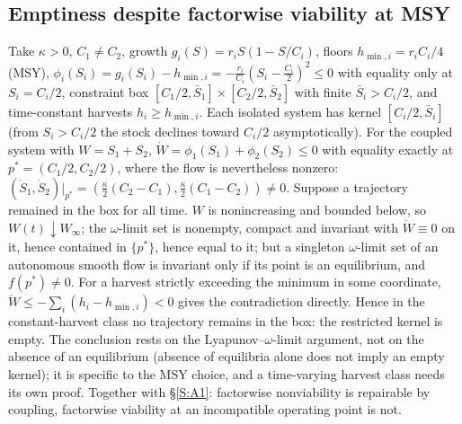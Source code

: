\subsection{Emptiness despite factorwise viability at MSY}\label{S:A2}
Take $\kappa>0$, $C_1\ne C_2$, growth $g_i(S)=r_iS(1-S/C_i)$, floors $h_{\min,i}=r_iC_i/4$ (MSY), $\phi_i(S_i)=g_i(S_i)-h_{\min,i}=-\tfrac{r_i}{C_i}(S_i-\tfrac{C_i}2)^2\le0$ with equality only at $S_i=C_i/2$, constraint box $[C_1/2,\bar S_1]\times[C_2/2,\bar S_2]$ with finite $\bar S_i>C_i/2$, and time-constant harvests $h_i\ge h_{\min,i}$. Each isolated system has kernel $[C_i/2,\bar S_i]$ (from $S_i>C_i/2$ the stock declines toward $C_i/2$ asymptotically). For the coupled system with $W=S_1+S_2$, $\dot W=\phi_1(S_1)+\phi_2(S_2)\le0$ with equality exactly at $p^*=(C_1/2,C_2/2)$, where the flow is nevertheless nonzero: $(\dot S_1,\dot S_2)|_{p^*}=(\tfrac\kappa2(C_2-C_1),\tfrac\kappa2(C_1-C_2))\ne0$. Suppose a trajectory remained in the box for all time. $W$ is nonincreasing and bounded below, so $W(t)\downarrow W_\infty$; the $\omega$-limit set is nonempty, compact and invariant with $\dot W\equiv0$ on it, hence contained in $\{p^*\}$, hence equal to it; but a singleton $\omega$-limit set of an autonomous smooth flow is invariant only if its point is an equilibrium, and $f(p^*)\ne0$. For a harvest strictly exceeding the minimum in some coordinate, $\dot W\le-\sum_i(h_i-h_{\min,i})<0$ gives the contradiction directly. Hence in the constant-harvest class no trajectory remains in the box: the restricted kernel is empty. The conclusion rests on the Lyapunov--$\omega$-limit argument, not on the absence of an equilibrium (absence of equilibria alone does not imply an empty kernel); it is specific to the MSY choice, and a time-varying harvest class needs its own proof. Together with \S\ref{S:A1}: factorwise nonviability is repairable by coupling, factorwise viability at an incompatible operating point is not.

